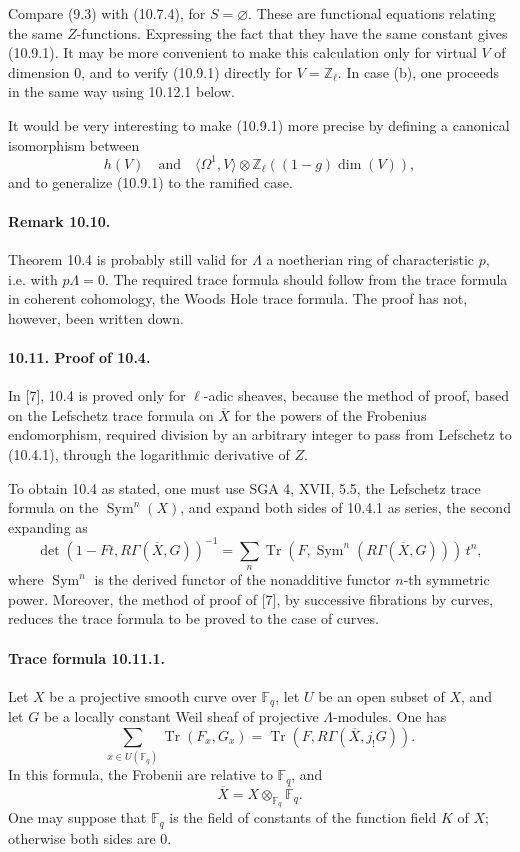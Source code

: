 \documentclass[10pt]{article}
\newcommand{\Z}{\mathbb Z}
\newcommand{\F}{\mathbb F}
\newcommand{\Tr}{\operatorname{Tr}}
\providecommand{\Tr}{\operatorname{Tr}}
\providecommand{\Tr}{\operatorname{Tr}}
\providecommand{\Sym}{\operatorname{Sym}}
\providecommand{\Tr}{\operatorname{Tr}}
\begin{document}
Compare (9.3) with (10.7.4), for \(S=\varnothing\). These are functional equations relating the same \(Z\)-functions. Expressing the fact that they have the same constant gives (10.9.1). It may be more convenient to make this calculation only for virtual \(V\) of dimension \(0\), and to verify (10.9.1) directly for \(V=\Z_\ell\). In case (b), one proceeds in the same way using 10.12.1 below.

It would be very interesting to make (10.9.1) more precise by defining a canonical isomorphism between
\[
h(V)
\quad\text{and}\quad
\langle\Omega^1,V\rangle\otimes \Z_\ell((1-g)\dim(V)),
\]
and to generalize (10.9.1) to the ramified case.

\paragraph{Remark 10.10.} Theorem 10.4 is probably still valid for \(\Lambda\) a noetherian ring of characteristic \(p\), i.e. with \(p\Lambda=0\). The required trace formula should follow from the trace formula in coherent cohomology, the Woods Hole trace formula. The proof has not, however, been written down.

\paragraph{10.11. Proof of 10.4.} In [7], 10.4 is proved only for \(\ell\)-adic sheaves, because the method of proof, based on the Lefschetz trace formula on \(\overline X\) for the powers of the Frobenius endomorphism, required division by an arbitrary integer to pass from Lefschetz to (10.4.1), through the logarithmic derivative of \(Z\).

To obtain 10.4 as stated, one must use SGA 4, XVII, 5.5, the Lefschetz trace formula on the \(\Sym^n(X)\), and expand both sides of 10.4.1 as series, the second expanding as
\[
\det(1-Ft,R\Gamma(\overline X,G))^{-1}
=
\sum_n \Tr(F,\Sym^n(R\Gamma(\overline X,G)))\,t^n,
\]
where \(\Sym^n\) is the derived functor of the nonadditive functor \(n\)-th symmetric power. Moreover, the method of proof of [7], by successive fibrations by curves, reduces the trace formula to be proved to the case of curves.

\paragraph{Trace formula 10.11.1.} Let \(X\) be a projective smooth curve over \(\F_q\), let \(U\) be an open subset of \(X\), and let \(G\) be a locally constant Weil sheaf of projective \(\Lambda\)-modules. One has
\[
\sum_{x\in U(\F_q)}\Tr(F_x,G_x)
=
\Tr(F,R\Gamma(\overline X,j_!G)).
\]
In this formula, the Frobenii are relative to \(\F_q\), and
\[
\overline X=X\otimes_{\F_q}\overline{\F}_q.
\]
One may suppose that \(\F_q\) is the field of constants of the function field \(K\) of \(X\); otherwise both sides are \(0\).
\end{document}

